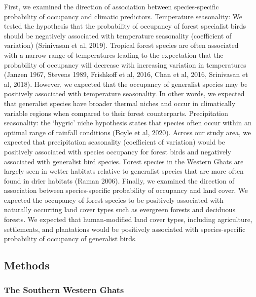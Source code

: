First, we examined the direction of association between species-specific probability of occupancy and climatic predictors.
Temperature seasonality: We tested the hypothesis that the probability of occupancy of forest specialist birds should be negatively associated with temperature seasonality (coefficient of variation) (Srinivasan et al, 2019).
Tropical forest species are often associated with a narrow range of temperatures leading to the expectation that the probability of occupancy will decrease with increasing variation in temperatures (Janzen 1967, Stevens 1989, Frishkoff et al, 2016, Chan et al, 2016, Srinivasan et al, 2018).
However, we expected that the occupancy of generalist species may be positively associated with temperature seasonality.
In other words, we expected that generalist species have broader thermal niches and occur in climatically variable regions when compared to their forest counterparts.
Precipitation seasonality: the `hygric' niche hypothesis states that species often occur within an optimal range of rainfall conditions (Boyle et al, 2020).
Across our study area, we expected that precipitation seasonality (coefficient of variation) would be positively associated with species occupancy for forest birds and negatively associated with generalist bird species.
Forest species in the Western Ghats are largely seen in wetter habitats relative to generalist species that are more often found in drier habitats (Raman 2006).
Finally, we examined the direction of association between species-specific probability of occupancy and land cover.
We expected the occupancy of forest species to be positively associated with naturally occurring land cover types such as evergreen forests and deciduous forests.
We expected that human-modified land cover types, including agriculture, settlements, and plantations would be positively associated with species-specific probability of occupancy of generalist birds.

\subsection*{Methods}

\subsubsection*{The Southern Western Ghats}

